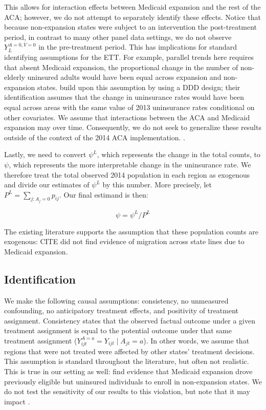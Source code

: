 \documentclass[12pt]{article}
\begin{document}
This allows for interaction effects between Medicaid expansion and the rest of the ACA; however, we do not attempt to separately identify these effects. Notice that because non-expansion states were subject to an intervention the post-treatment period, in contrast to many other panel data settings, we do not observe $Y_L^{A = 0, V = 0}$ in the pre-treatment period. This has implications for standard identifying assumptions for the ETT. For example, parallel trends here requires that absent Medicaid expansion, the proportional change in the number of non-elderly uninsured adults would have been equal across expansion and non-expansion states. \cite{courtemanche2017early} build upon this assumption by using a DDD design; their identification assumes that the change in uninsurance rates would have been equal across areas with the same value of 2013 uninsurance rates conditional on other covariates. We assume that interactions between the ACA and Medicaid expansion may over time. Consequently, we do not seek to generalize these results outside of the context of the 2014 ACA implementation. .

Lastly, we need to convert $\psi^L$, which represents the change in the total counts, to $\psi$, which represents the more interpretable change in the uninsurance rate. We therefore treat the total observed 2014 population in each region as exogenous and divide our estimates of $\psi^L$ by this number. More precisely, let $P^L = \sum_{j: A_j = 0} p_{ij}$. Our final estimand is then:

$$
\psi = \psi^L/P^L
$$

The existing literature supports the assumption that these population counts are exogenous: CITE did not find evidence of migration across state lines due to Medicaid expansion. 

\subsection{Identification}

We make the following causal assumptions: consistency, no unmeasured confounding, no anticipatory treatment effects, and positivity of treatment assignment. Consistency states that the observed factual outcome under a given treatment assignment is equal to the potential outcome under that same treatment assignment ($Y_{ijt}^{A = a} = Y_{ijt} \mid A_{jt} = a$). In other words, we assume that regions that were not treated were affected by other states' treatment decisions. This assumption is standard throughout the literature, but often not realistic. This is true in our setting as well: \cite{frean2017premium} find evidence that Medicaid expansion drove previously eligible but uninsured individuals to enroll in non-expansion states. We do not test the sensitivity of our results to this violation, but note that it may impact .
\end{document}
